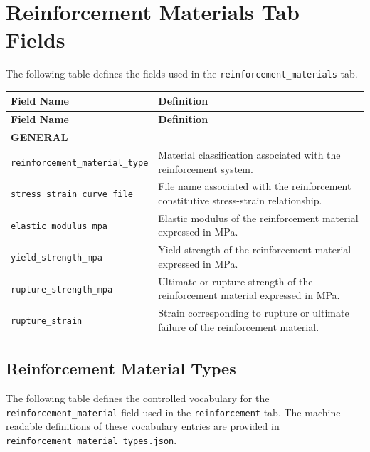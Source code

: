 \documentclass[11pt]{book}
\begin{document}
{\section{Reinforcement Materials Tab Fields}
\label{vocab:reinforcement_materials_tab}
The following table defines the fields used in the \texttt{reinforcement\_materials} tab. 
\begin{longtable}{p{}p{}}
\hline
\textbf{Field Name} & \textbf{Definition} \\
\hline
\endfirsthead

\hline
\textbf{Field Name} & \textbf{Definition} \\
\hline
\endhead

\multicolumn{2}{l}{\textbf{GENERAL}}\\
\hline

\texttt{reinforcement\_material\_type} &
Material classification associated with the reinforcement system. \\

\texttt{stress\_strain\_curve\_file} &
File name associated with the reinforcement constitutive stress-strain relationship. \\

\texttt{elastic\_modulus\_mpa} &
Elastic modulus of the reinforcement material expressed in MPa. \\

\texttt{yield\_strength\_mpa} &
Yield strength of the reinforcement material expressed in MPa. \\

\texttt{rupture\_strength\_mpa} &
Ultimate or rupture strength of the reinforcement material expressed in MPa. \\

\texttt{rupture\_strain} &
Strain corresponding to rupture or ultimate failure of the reinforcement material. \\

\hline
\end{longtable}

\subsection{Reinforcement Material Types}
\label{vocab:reinforcement_material_types_list}

The following table defines the controlled vocabulary for the \texttt{reinforcement\_material} field used in the \texttt{reinforcement} tab. The machine-readable definitions of these vocabulary entries are provided in \texttt{reinforcement\_material\_types.json}.

}
\end{document}
